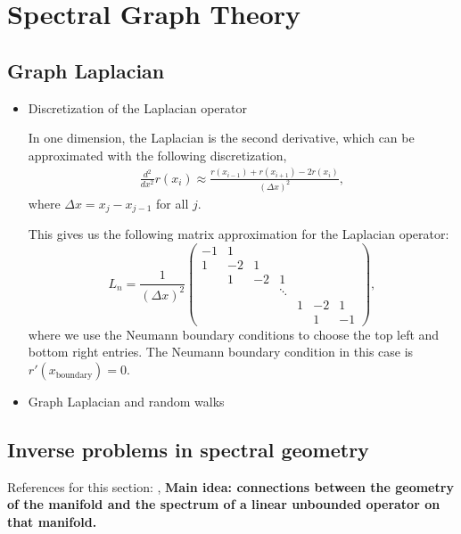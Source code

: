 \section{Spectral Graph Theory}

\subsection{Graph Laplacian}
\begin{itemize}
    \item Discretization of the Laplacian operator
    
  In one dimension, the Laplacian is the second derivative, which can be approximated with the following discretization,
\begin{align}
    \frac{d^2}{dx^2}r(x_i) \approx \frac{r(x_{i-1}) + r(x_{i+1}) - 2 r(x_i)}{(\Delta x)^2},
\end{align}
where $\Delta x = x_j - x_{j-1}$ for all $j$.

This gives us the following matrix approximation for the Laplacian operator:
\begin{equation}
L_n = \frac{1}{(\Delta x)^2}
\begin{pmatrix}
    -1  &1  &   &   &   &   &\\
    1   &-2 &1  &   &   &   &\\
        &1  &-2 &1  &   &   &\\
        &   &   &\ddots & & &\\
        &   &   &   &1  &-2 &1\\
        &   &   &   &   &1  &-1
\end{pmatrix},
\end{equation}
where we use the Neumann boundary conditions to choose the top left and bottom right entries. The Neumann boundary condition in this case is $r'(x_{\text{boundary}}) = 0$.

\item Graph Laplacian and random walks

\end{itemize}

\subsection{Inverse problems in spectral geometry}
References for this section: \cite{lablee_spectral_2015}, \cite{kac_can_1966}
\textbf{Main idea: connections between the geometry of the manifold and the spectrum of a linear unbounded operator on that manifold. }

